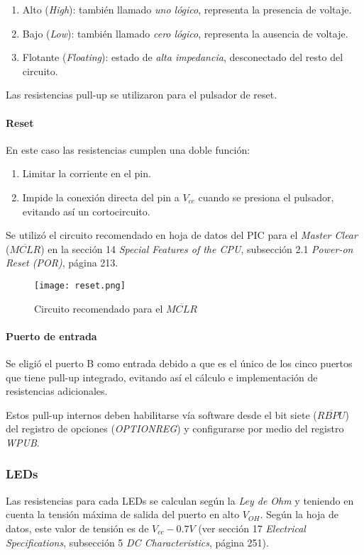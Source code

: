 \documentclass[12pt,a4paper]{article}
\begin{document}
\begin{enumerate}[leftmargin=1.5cm,nosep]
\item Alto (\emph{High}): también llamado \emph{uno lógico}, representa la presencia de voltaje.
\item Bajo (\emph{Low}): también llamado \emph{cero lógico}, representa la ausencia de voltaje.
\item Flotante (\emph{Floating}): estado de \emph{alta impedancia}, desconectado del resto del circuito.
\end{enumerate}
	
	 Las resistencias pull-up se utilizaron para el pulsador de reset.	
	
	\paragraph{Reset}
	En este caso las resistencias cumplen una doble función:
	\begin{enumerate}[leftmargin=1.5cm,nosep]
	\item Limitar la corriente en el pin.
	\item Impide la conexión directa del pin a $V_{cc}$ cuando se presiona el pulsador, evitando así un cortocircuito.
	\end{enumerate}
	
	Se utilizó el circuito recomendado en hoja de datos del PIC para el \emph{Master Clear} ($\overline{MCLR}$) en la sección 14 \emph{Special Features of the CPU}, subsección 2.1 \emph{Power-on Reset (POR)}, página 213.
	
	\begin{figure}[h]
	\texttt{[image: reset.png]}
	\centering
	\caption{Circuito recomendado para el $\overline{MCLR}$}
	\end{figure}
	
	\paragraph{Puerto de entrada}
	Se eligió el puerto B como entrada debido a que es el único de los cinco puertos que tiene pull-up integrado, evitando así el cálculo e implementación de resistencias adicionales. 
	
	Estos pull-up internos deben habilitarse vía software desde el bit siete (\emph{$\overline{RBPU}$}) del registro de opciones (\emph{OPTION\textunderscore REG}) y configurarse por medio del registro \emph{WPUB}.
	
\subsubsection{LEDs}
	Las resistencias para cada LEDs se calculan según la \emph{Ley de Ohm} y teniendo en cuenta la tensión máxima de salida del puerto en alto $V_{OH}$. Según la hoja de datos,  este valor de tensión es de $V_{cc}-0.7 V$ (ver sección 17 \emph{Electrical Specifications}, subsección 5 \emph{DC Characteristics}, página 251).
	
\end{document}
